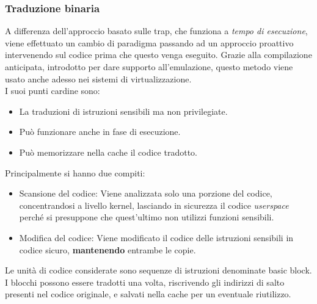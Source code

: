 \documentclass{article}
\begin{document}
		\subsubsection{Traduzione binaria}
		A differenza dell'approccio basato sulle trap, che funziona a \textit{tempo di esecuzione}, viene effettuato un cambio di paradigma passando ad un approccio proattivo intervenendo sul codice prima che questo venga eseguito. 
		Grazie alla compilazione anticipata, introdotto per dare supporto all'emulazione, questo metodo viene usato anche adesso nei sistemi di virtualizzazione.\\
		I suoi punti cardine sono:
		\begin{itemize}
		    \item La traduzioni di istruzioni sensibili ma non privilegiate.
		    \item Può funzionare anche in fase di esecuzione.
		    \item Può memorizzare nella cache il codice tradotto. 
		\end{itemize}
		Principalmente si hanno due compiti:
		\begin{itemize}
		    \item Scansione del codice: Viene analizzata solo una porzione del codice, concentrandosi a livello kernel, lasciando in sicurezza il codice \emph{userspace} perché si presuppone che quest'ultimo non utilizzi funzioni sensibili.
		    \item Modifica del codice: Viene modificato il codice delle istruzioni sensibili in codice sicuro, \textbf{mantenendo} entrambe le copie.
		\end{itemize}
		Le unità di codice considerate sono sequenze di istruzioni denominate basic block.
		I blocchi possono essere tradotti una volta, riscrivendo gli indirizzi di salto presenti nel codice originale, e salvati nella cache per un eventuale riutilizzo.
\end{document}
